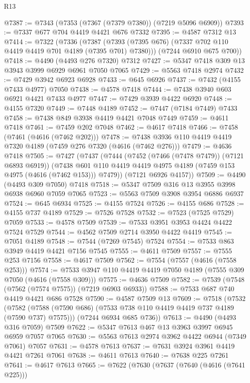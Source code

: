 \begin{lexlean}{R13}
\begin{coremodule}
@7387 := @7343 (@7353 (@7367 (@7379 @7380)) (@7219 @5096 @6909))
@7393 := @7337 @677 @704 @4419 @4421 @676 @7332
@7395 := @4587 @7312 @13
@7414 := @7322
    (@7336
      (@7387 (@7393 (@7395 @676) (@7337 @702 @110 @4419 @4419 @701 @4189 (@7395 @701) @7380)))
      (@7244 @6910 @675 @700))
@7418 := @4490 (@4493 @276 @7320) @7312
@7427 := @5347 @7418 @309 @13 @3943 @3999 @6929 @6961 @7050 @7065
@7429 := @5563 @7418 @2974
@7432 := @7429 @3942 @6923 @6928
@7433 := @645 @6926
@7437 := @7432 (@4155 @7433 @4977) @7050
@7438 := @4578 @7418
@7444 := @7438 @3940 @603 @6921 @4421 @7433 @4977
@7447 := @7429 @3939 @4422 @6920
@7448 := @4155 @7320
@7449 := @7448 @4189
@7452 := @7447 (@7184 @7449) @7433
@7458 := @7438 @849 @3938 @4419 @4421 @7048 @7449
@7459 := @4611 @7418
@7461 := @7459 @202 @7048
@7462 := @4617 @7418
@7466 := @7458 (@7461 (@4616 (@7462 @202)))
@7478 := @7438 @3936 @110 @4419 @4419 @7320 @4189 (@7459 @276 @7320 (@4616 (@7462 @276)))
@7479 := @4636 @7418
@7505 := @7427
    (@7437
      (@7444
        (@7452 (@7466 (@7478 @7479)) (@7121 @6893 @6919))
        (@7438 @601 @110 @4419 @4419 @4975 @4189 (@7459 @153 @4975 (@4616 (@7462 @153))) @7479))
      (@7121 @6926 @4157))
@7509 := @4490 (@4493 @309 @7050) @7418
@7518 := @5347 @7509 @316 @13 @3955 @3998 @6938 @6960 @7059 @7065
@7523 := @5563 @7509 @3908 @3954 @6886 @6937
@7524 := @645 @6934
@7525 := @4155 @7524
@7526 := @4155 @686
@7528 := @4155 @737 @4189
@7529 := @7526 @7528
@7532 := @7523 (@7525 @7529) @7059
@7533 := @4578 @7509
@7539 := @7533 @3951 @3953 @4424 @4422 @7524 @7529
@7544 := @4562 @7509 @2714 @3950 @4422 @4419
@7545 := @7051 @4189
@7548 := @7544 (@7269 @7545) @7524
@7554 := @7533 @863 @3949 @4419 @4421 @7156 @7545
@7555 := @4611 @7509
@7557 := @7555 @253 @7156
@7558 := @4617 @7509
@7562 := @7554 (@7557 (@4616 (@7558 @253)))
@7574 := @7533 @3947 @110 @4419 @4419 @7050 @4189 (@7555 @309 @7050 (@4616 (@7558 @309)))
@7575 := @4636 @7509
@7582 := @7539 (@7548 (@7562 (@7574 @7575)) (@7219 @6903 @6933))
@7588 := @7533 @687 @740 @4419 @4421 @686 @7528
@7590 := @4587 @7509 @13
@7609 := @7518
    (@7532
      (@7582 (@7588 (@7590 @686) (@7533 @738 @110 @4419 @4419 @737 @4189 (@7590 @737) @7575)))
      (@7244 @6934 @685 @736))
@7613 := @4490 (@4493 @316 @7059) @7509
@7622 := @5347 @7613 @467 @13 @3963 @3997 @6945 @6959 @7057 @7065
@7630 := @5563 @7613 @2974 @3962 @4422 @6944 (@7349 @7061) @7057
@7631 := @4578 @7613
@7637 := @7631 @3924 @3961 @4419 @4421 @7261 @7061
@7638 := @4611 @7613
@7640 := @7638 @225 @7261
@7641 := @4617 @7613
@7665 := @7622
    (@7630
      (@7637
        (@7640 (@4616 (@7641 @225)))

\end{coremodule}
\end{lexlean}
